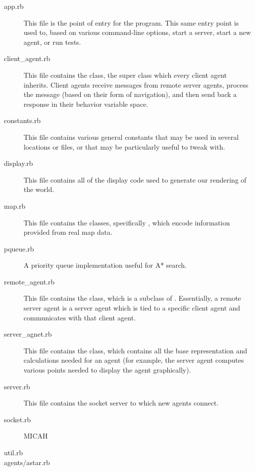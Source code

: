 \documentclass{article}
\begin{document}
\begin{description}
\item[app.rb] This file is the point of entry for the program. This same entry
  point is used to, based on various command-line options, start a server, start
  a new agent, or run tests.

\item[client_agent.rb] This file contains the  class, the
  super class which every client agent inherits. Client agents receive messages
  from remote server agents, process the message (based on their form of
  navigation), and then send back a response in their behavior variable space.

\item[constants.rb] This file contains various general constants that may be
  used in several locations or files, or that may be particularly useful to
  tweak with.

\item[display.rb] This file contains all of the display code used to generate
  our rendering of the world.

\item[map.rb] This file contains the classes, specifically , which
  encode information provided from real map data.

\item[pqueue.rb] A priority queue implementation useful for A* search.

\item[remote_agent.rb] This file contains the  class,
  which is a subclass of . Essentially, a remote server agent
  is a server agent which is tied to a specific client agent and communicates
  with that client agent.

\item[server_agnet.rb] This file contains the  class, which
  contains all the base representation and calculations needed for an agent (for
  example, the server agent computes various points needed to display the agent
  graphically).

\item[server.rb] This file contains the socket server to which new agents
  connect.

\item[socket.rb] MICAH

\item[util.rb]

\item[agents/astar.rb]


\end{description}
\end{document}
